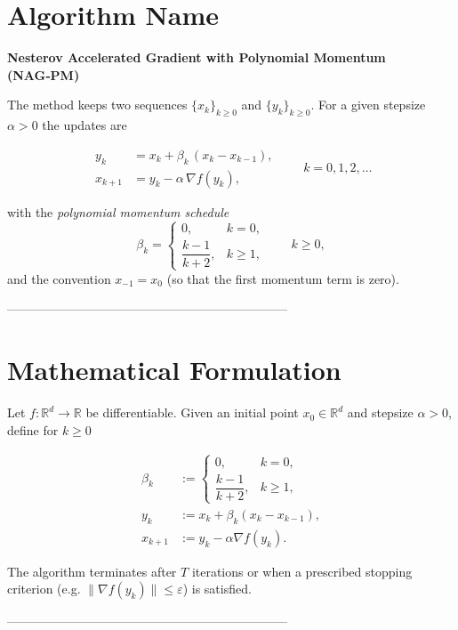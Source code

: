 \documentclass[11pt]{article}
\newcommand{\R}{\mathbb{R}}
\begin{document}
\section*{Algorithm Name}
\textbf{Nesterov Accelerated Gradient with Polynomial Momentum (NAG‑PM)}  

The method keeps two sequences $\{x_k\}_{k\ge 0}$ and $\{y_k\}_{k\ge 0}$.
For a given stepsize $\alpha>0$ the updates are  

\[
\boxed{
\begin{aligned}
y_k &= x_k + \beta_k\,(x_k-x_{k-1}),\\[2mm]
x_{k+1} &= y_k - \alpha \,\nabla f(y_k),
\end{aligned}}
\qquad k=0,1,2,\dots
\]

with the \emph{polynomial momentum schedule}
\[
\beta_k = 
\begin{cases}
0, & k=0,\\[1mm]
\dfrac{k-1}{k+2}, & k\ge 1,
\end{cases}
\qquad k\ge 0,
\]
and the convention $x_{-1}=x_0$ (so that the first momentum term is zero).

--------------------------------------------------------------------

\section*{Mathematical Formulation}
Let $f:\R^{d}\rightarrow\R$ be differentiable.  
Given an initial point $x_0\in\R^{d}$ and stepsize $\alpha>0$, define for $k\ge 0$

\begin{align}
\beta_k &:= 
\begin{cases}
0, & k=0,\\[1mm]
\dfrac{k-1}{k+2}, & k\ge 1,
\end{cases} \label{eq:beta}\\
y_k    &:= x_k + \beta_k (x_k-x_{k-1}), \label{eq:y}\\
x_{k+1}&:= y_k - \alpha \nabla f(y_k). \label{eq:x}
\end{align}

The algorithm terminates after $T$ iterations or when a prescribed stopping
criterion (e.g. $\|\nabla f(y_k)\|\le\varepsilon$) is satisfied.

--------------------------------------------------------------------
\end{document}
